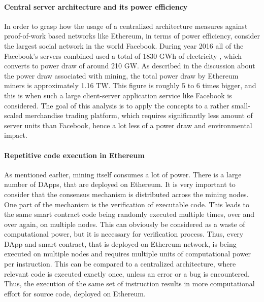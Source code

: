 \paragraph{Central server architecture and its power efficiency}
In order to grasp how the usage of a centralized architecture measures against proof-of-work based networks like Ethereum, in terms of power efficiency, consider the largest social network in the world Facebook. During year 2016 all of the Facebook's servers combined used a total of 1830 GWh of electricity \citep{facebookserverpower}, which converts to power draw of around 210 GW. As described in the discussion about the power draw associated with mining, the total power draw by Ethereum miners is approximately 1.16 TW. This figure is roughly 5 to 6 times bigger, and this is when such a large client-server application service like Facebook is considered. The goal of this analysis is to apply the concepts to a rather small-scaled merchandise trading platform, which requires significantly less amount of server units than Facebook, hence a lot less of a power draw and environmental impact. 

\paragraph{Repetitive code execution in Ethereum}
As mentioned earlier, mining itself consumes a lot of power. There is a large number of DApps, that are deployed on Ethereum. It is very important to consider that the consensus mechanism is distributed across the mining nodes. One part of the mechanism is the verification of executable code. This leads to the same smart contract code being randomly executed multiple times, over and over again, on multiple nodes. This can obviously be considered as a waste of computational power, but it is necessary for verification process. Thus, every DApp and smart contract, that is deployed on Ethereum network, is being executed on multiple nodes and requires multiple units of computational power per instruction. This can be compared to a centralized architecture, where relevant code is executed exactly once, unless an error or a bug is encountered. Thus, the execution of the same set of instruction results in more computational effort for source code, deployed on Ethereum.

